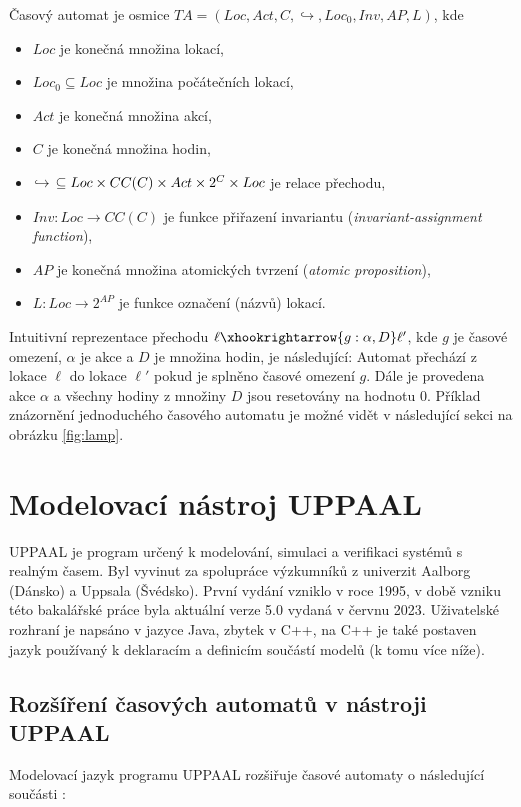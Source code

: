\bigskip

Časový automat je osmice $TA = (Loc, Act, C, \hookrightarrow, Loc_0, Inv, AP, L)$, kde

\begin{itemize}
    \item $Loc$ je konečná množina lokací,
    \item $Loc_0 \subseteq Loc$ je množina počátečních lokací,
    \item $Act$ je konečná množina akcí,
    \item $C$ je konečná množina hodin,
    \item $\hookrightarrow \hspace{0.15cm} \subseteq Loc \times CC(C) \times Act \times 2^C \times Loc$ je relace přechodu,
    \item $Inv: Loc \rightarrow CC(C)$ je funkce přiřazení invariantu (\textit{invariant-assignment function}),
    \item $AP$ je konečná množina atomických tvrzení (\textit{atomic proposition}),
    \item $L: Loc \rightarrow 2^{AP}$ je funkce označení (názvů) lokací.
\end{itemize}

Intuitivní reprezentace přechodu $\ell \xhookrightarrow{g:\alpha,D} \ell'$, kde $g$ je časové omezení, $\alpha$ je akce a $D$ je množina hodin, je následující: Automat přechází z lokace $\ell$ do lokace $\ell'$ pokud je splněno časové omezení $g$. Dále je provedena akce $\alpha$ a všechny hodiny z množiny $D$ jsou resetovány na hodnotu 0. Příklad znázornění jednoduchého časového automatu je možné vidět v následující sekci na obrázku \ref{fig:lamp}.

\section{Modelovací nástroj UPPAAL} \label{uppaal}
UPPAAL je program určený k modelování, simulaci a verifikaci systémů s realným časem. Byl vyvinut za spolupráce výzkumníků z univerzit Aalborg (Dánsko) a Uppsala (Švédsko). První vydání vzniklo v roce 1995, v době vzniku této bakalářské práce byla aktuální verze 5.0 vydaná v červnu 2023. Uživatelské rozhraní je napsáno v jazyce Java, zbytek v C++, na C++ je také postaven jazyk používaný k deklaracím a definicím součástí modelů (k tomu více níže).

\subsection{Rozšíření časových automatů v nástroji UPPAAL}
Modelovací jazyk programu UPPAAL rozšiřuje časové automaty o následující součásti \cite{uppaal_intro}:

